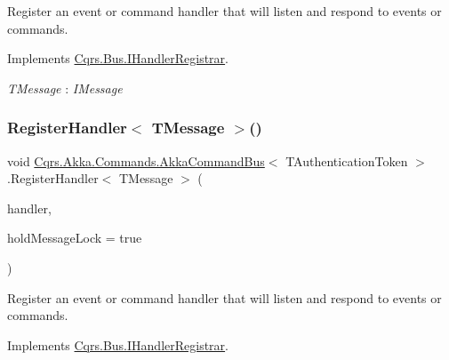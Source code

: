 Register an event or command handler that will listen and respond to events or commands. 



Implements \hyperlink{interfaceCqrs_1_1Bus_1_1IHandlerRegistrar_ab6ca4dfdc54a5aeebe4651dbdb479f55_ab6ca4dfdc54a5aeebe4651dbdb479f55}{Cqrs.\+Bus.\+I\+Handler\+Registrar}.

\begin{Desc}
\item[Type Constraints]\begin{description}
\item[{\em T\+Message} : {\em I\+Message}]\end{description}
\end{Desc}
\mbox{\label{classCqrs_1_1Akka_1_1Commands_1_1AkkaCommandBus_adc21072d2b02c745747c4d585a53dba3_adc21072d2b02c745747c4d585a53dba3}} 
\subsubsection{\texorpdfstring{Register\+Handler$<$ T\+Message $>$()}{RegisterHandler< TMessage >()}\hspace{0.1cm}{\footnotesize\ttfamily [2/2]}}
{\footnotesize\ttfamily void \hyperlink{classCqrs_1_1Akka_1_1Commands_1_1AkkaCommandBus}{Cqrs.\+Akka.\+Commands.\+Akka\+Command\+Bus}$<$ T\+Authentication\+Token $>$.Register\+Handler$<$ T\+Message $>$ (\begin{DoxyParamCaption}\item[{Action$<$ T\+Message $>$}]{handler,  }\item[{bool}]{hold\+Message\+Lock = {\ttfamily true} }\end{DoxyParamCaption})}



Register an event or command handler that will listen and respond to events or commands. 



Implements \hyperlink{interfaceCqrs_1_1Bus_1_1IHandlerRegistrar_a07792dcc9a8b272709ff2e2dd336a642_a07792dcc9a8b272709ff2e2dd336a642}{Cqrs.\+Bus.\+I\+Handler\+Registrar}.

